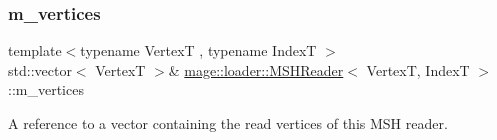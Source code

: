 \subsubsection{\texorpdfstring{m\+\_\+vertices}{m\_vertices}}
{\footnotesize\ttfamily template$<$typename VertexT , typename IndexT $>$ \\
std\+::vector$<$ VertexT $>$\& \hyperlink{classmage_1_1loader_1_1_m_s_h_reader}{mage\+::loader\+::\+M\+S\+H\+Reader}$<$ VertexT, IndexT $>$\+::m\+\_\+vertices\hspace{0.3cm}{\ttfamily [private]}}

A reference to a vector containing the read vertices of this M\+SH reader. 